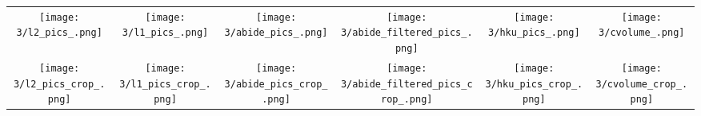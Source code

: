\begin{tabular}{c @{\hskip 0pt} c @{\hskip 0pt} c @{\hskip 0pt} c @{\hskip 0pt} c @{\hskip 0pt} c}
    \texttt{[image: 3/l2\_pics\_.png]}&
    \texttt{[image: 3/l1\_pics\_.png]}&
    \texttt{[image: 3/abide\_pics\_.png]}&
    \texttt{[image: 3/abide\_filtered\_pics\_.png]}&
    \texttt{[image: 3/hku\_pics\_.png]}&
    \texttt{[image: 3/cvolume\_.png]}\\
    \texttt{[image: 3/l2\_pics\_crop\_.png]}&
    \texttt{[image: 3/l1\_pics\_crop\_.png]}&
    \texttt{[image: 3/abide\_pics\_crop\_.png]}&
    \texttt{[image: 3/abide\_filtered\_pics\_crop\_.png]}&
    \texttt{[image: 3/hku\_pics\_crop\_.png]}&
    \texttt{[image: 3/cvolume\_crop\_.png]}
\end{tabular}